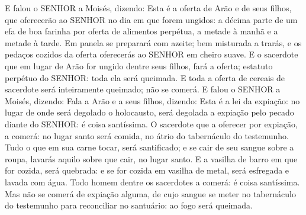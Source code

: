 {E falou o SENHOR a Moisés, dizendo:
Esta é a oferta de Arão e de seus filhos, que oferecerão ao SENHOR no dia em que forem ungidos: a décima parte de um efa de boa farinha por oferta de alimentos perpétua, a metade à manhã e a metade à tarde.
Em panela se preparará com azeite; bem misturada a trarás, e os pedaços cozidos da oferta oferecerás ao SENHOR em cheiro suave.
E o sacerdote que em lugar de Arão for ungido dentre seus filhos, fará a oferta; estatuto perpétuo do SENHOR: toda ela será queimada.
E toda a oferta de cereais de sacerdote será inteiramente queimado; não se comerá.
E falou o SENHOR a Moisés, dizendo:
Fala a Arão e a seus filhos, dizendo: Esta é a lei da expiação: no lugar de onde será degolado o holocausto, será degolada a expiação pelo pecado diante do SENHOR: é coisa santíssima.
O sacerdote que a oferecer por expiação, a comerá: no lugar santo será comida, no átrio do tabernáculo do testemunho.
Tudo o que em sua carne tocar, será santificado; e se cair de seu sangue sobre a roupa, lavarás aquilo sobre que cair, no lugar santo.
E a vasilha de barro em que for cozida, será quebrada: e se for cozida em vasilha de metal, será esfregada e lavada com água.
Todo homem dentre os sacerdotes a comerá: é coisa santíssima.
Mas não se comerá de expiação alguma, de cujo sangue se meter no tabernáculo do testemunho para reconciliar no santuário: ao fogo será queimada.

}
